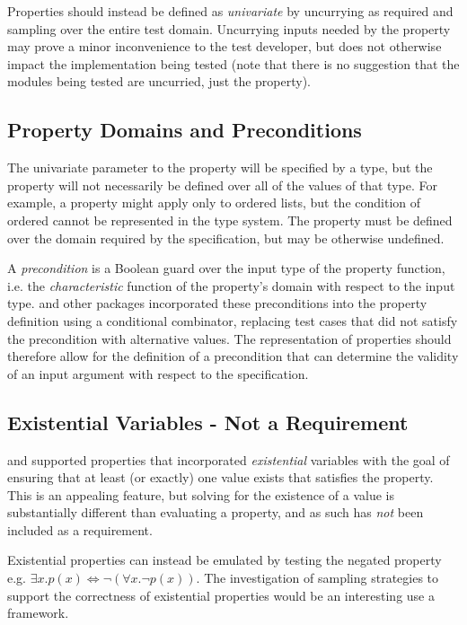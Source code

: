 Properties should instead be defined as \emph{univariate}
by uncurrying as required and sampling over the entire test domain.
Uncurrying inputs needed by the property
may prove a minor inconvenience to the test developer,
but does not otherwise impact the implementation being tested
(note that there is no suggestion that the modules being tested are uncurried, just the property).

\subsection{Property Domains and Preconditions}
The univariate parameter to the property will be specified by a type,
but the property will not necessarily be defined over all of the values of that type.
For example, a property might apply only to ordered lists,
but the condition of ordered cannot be represented in the type system.
The property must be defined over the domain required by the specification, 
but may be otherwise undefined.

A \emph{precondition} is a Boolean guard over the input type of the property function,
i.e. the \emph{characteristic} function of the property's domain with respect to the input type.
\QC and other packages incorporated these preconditions into the property definition
using a conditional combinator,
replacing test cases that did not satisfy the precondition with alternative values.
The representation of properties should therefore allow for the definition of a precondition
that can determine the validity of an input argument with respect to the specification.

\subsection{Existential Variables - Not a Requirement}

\SC and \GAST supported properties that incorporated \emph{existential} variables
with the goal of ensuring that at least (or exactly) one value exists that satisfies the property.
This is an appealing feature,
but solving for the existence of a value is substantially different than evaluating a property,
and as such has \emph{not} been included as a requirement.

Existential properties can instead be emulated by testing the negated property
e.g. $\exists x . p (x) \iff \neg (\forall x . \neg p (x))$.
The investigation of sampling strategies to support the correctness of existential properties
would be an interesting use a \pbt framework.


